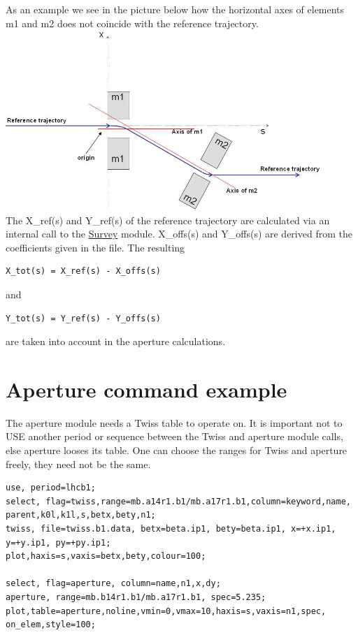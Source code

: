 As an example we see in the picture below how the horizontal axes of elements m1 and m2 does not coincide with the reference trajectory. 
\\
\includegraphics[width=450px]{Introduction/offsetelem.jpg}
\\ The X\_ref(s) and Y\_ref(s) of the reference trajectory are calculated via an internal call to the \href{../survey/survey.html}{Survey} module. X\_offs(s) and Y\_offs(s) are derived from the coefficients given in the file. The resulting 
\begin{verbatim}
X_tot(s) = X_ref(s) - X_offs(s)\end{verbatim} and 
\begin{verbatim}
Y_tot(s) = Y_ref(s) - Y_offs(s)\end{verbatim} are taken into account in the aperture calculations.  


\section{Aperture command example}

The aperture module needs a Twiss table to operate on. It is important  not to USE another period or sequence between the Twiss and aperture  module calls, else aperture looses its table. One can choose the ranges  for Twiss and aperture freely, they need not be the same. 

\begin{verbatim}
use, period=lhcb1;
select, flag=twiss,range=mb.a14r1.b1/mb.a17r1.b1,column=keyword,name,
parent,k0l,k1l,s,betx,bety,n1;
twiss, file=twiss.b1.data, betx=beta.ip1, bety=beta.ip1, x=+x.ip1, 
y=+y.ip1, py=+py.ip1;
plot,haxis=s,vaxis=betx,bety,colour=100;

select, flag=aperture, column=name,n1,x,dy;
aperture, range=mb.b14r1.b1/mb.a17r1.b1, spec=5.235;
plot,table=aperture,noline,vmin=0,vmax=10,haxis=s,vaxis=n1,spec,
on_elem,style=100;
\end{verbatim}

